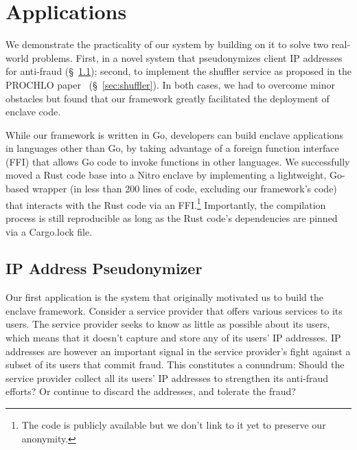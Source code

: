 \section{Applications}
\label{sec:applications}

We demonstrate the practicality of our system by building on it to solve two
real-world problems.  First, in a novel system that pseudonymizes client IP
addresses for anti-fraud (\S~\ref{sec:pseudonymization}); second, to implement
the shuffler service as proposed in the PROCHLO paper~\cite{Bittau2017a}
(\S~\ref{sec:shuffler}).  In both cases, we had to overcome minor obstacles but
found that our framework greatly facilitated the deployment of enclave code.

While our framework is written in Go, developers can build enclave applications
in languages other than Go, by taking advantage of a foreign function interface
(FFI) that allows Go code to invoke functions in other languages.  We
successfully moved a Rust code base into a Nitro enclave by implementing a
lightweight, Go-based wrapper (in less than 200 lines of code, excluding our
framework's code) that interacts with the Rust code via an FFI.\footnote{The
code is publicly available but we don't link to it yet to preserve our
anonymity.} Importantly, the compilation process is still reproducible as long
as the Rust code's dependencies are pinned via a Cargo.lock file.

\subsection{IP Address Pseudonymizer}
\label{sec:pseudonymization}

Our first application is the system that originally motivated us to build the
enclave framework. Consider a service provider that offers various services to
its users.  The service provider seeks to know as little as possible about its
users, which means that it doesn't capture and store any of its users' IP
addresses.  IP addresses are however an important signal in the service
provider's fight against a subset of its users that commit fraud.  This
constitutes a conundrum: Should the service provider collect all its users' IP
addresses to strengthen its anti-fraud efforts?  Or continue to discard the
addresses, and tolerate the fraud?


